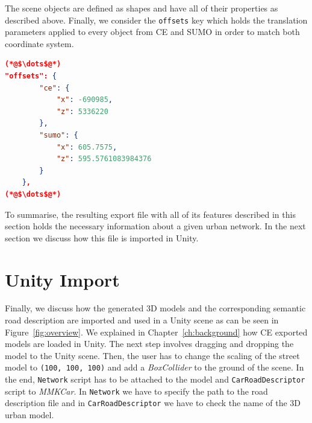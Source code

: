The scene objects are defined as shapes and have all of their properties as described above. Finally, we consider the \texttt{offsets} key which holds the translation parameters applied to every object from CE and SUMO in order to match both coordinate system. \\

    \begin{scriptsize}
        \begin{lstlisting}[language=json,firstnumber=1,caption={General overview of the offsets key in the JSON export format.},label={lis:format-node}]
(*@$\dots$@*)
"offsets": {
        "ce": {
            "x": -690985,
            "z": 5336220
        },
        "sumo": {
            "x": 605.7575,
            "z": 595.5761083984376
        }
    },
(*@$\dots$@*)
	   \end{lstlisting}
    \end{scriptsize}
    
To summarise, the resulting export file with all of its features described in this section holds the necessary information about a given urban network. In the next section we discuss how this file is imported in Unity.

\section{Unity Import}

Finally, we discuss how the generated 3D models and the corresponding semantic road description are imported and used in a Unity scene as can be seen in Figure~\ref{fig:overview}. We explained in Chapter~\ref{ch:background} how CE exported models are loaded in Unity. The next step involves dragging and dropping the model to the Unity scene. Then, the user has to change the scaling of the street model to \texttt{(100, 100, 100)} and add a \emph{BoxCollider} to the ground of the scene. In the end, \texttt{Network} script has to be attached to the model and \texttt{CarRoadDescriptor} script to \emph{MMKCar}. In \texttt{Network} we have to specify the path to the road description file and in \texttt{CarRoadDescriptor} we have to check the name of the 3D urban model. 

